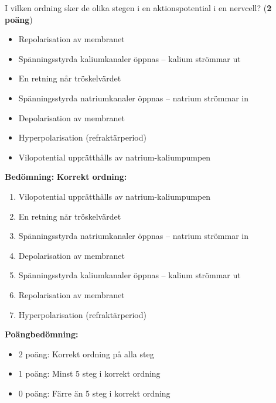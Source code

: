 \documentclass{exam}
\newenvironment{answer}
  {\begin{framed}\color{blue}\textbf{Bedömning:} }
  {\end{framed}}
\begin{document}
\vspace{5mm} %
\begin{center}
\end{center}
\begin{questions}

\question I vilken ordning sker de olika stegen i en aktionspotential i en nervcell? (\textbf{2 poäng})

\begin{itemize}
  \item Repolarisation av membranet
  \item Spänningsstyrda kaliumkanaler öppnas – kalium strömmar ut
  \item En retning når tröskelvärdet
  \item Spänningsstyrda natriumkanaler öppnas – natrium strömmar in
  \item Depolarisation av membranet
  \item Hyperpolarisation (refraktärperiod)
  \item Vilopotential upprätthålls av natrium-kaliumpumpen
\end{itemize}

\begin{answer}
\textbf{Korrekt ordning:}
\begin{enumerate}
  \item Vilopotential upprätthålls av natrium-kaliumpumpen
  \item En retning når tröskelvärdet
  \item Spänningsstyrda natriumkanaler öppnas – natrium strömmar in
  \item Depolarisation av membranet
  \item Spänningsstyrda kaliumkanaler öppnas – kalium strömmar ut
  \item Repolarisation av membranet
  \item Hyperpolarisation (refraktärperiod)
\end{enumerate}

\textbf{Poängbedömning:}
\begin{itemize}
  \item 2 poäng: Korrekt ordning på alla steg
  \item 1 poäng: Minst 5 steg i korrekt ordning
  \item 0 poäng: Färre än 5 steg i korrekt ordning
\end{itemize}
\end{answer}
\vspace{5mm} %


\end{questions}
\end{document}
